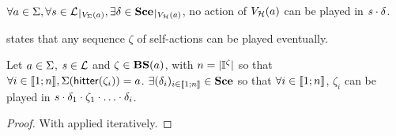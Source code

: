 \begin{corollary}
\label{co:totalss}
  $\forall a \in \PHs, \forall s \in \restriction{\PHl}{\Vs(a)}, \exists \delta \in \restriction{\Sce}{\Vh(a)}$, no action of $V_{\mathcal{H}}(a)$ can be played in $s \cdot \delta$.
\end{corollary}



 states that any sequence $\zeta$ of self-actions can be played eventually.
\begin{theorem}
\label{th:autohits}
  Let $a \in \Sigma$, $s \in \mathcal{L}$ and $\zeta \in \mathbf{BS}(a)$, with $n = |\mathbb{I}^{\zeta}|$ so that $\forall i \in \llbracket 1; n \rrbracket, \Sigma(\mathsf{hitter}(\zeta_i)) = a$.
  $\exists (\delta_i)_{i \in \llbracket 1; n \rrbracket} \in \mathbf{Sce}$ so that $\forall i \in \llbracket 1; n \rrbracket$, $\zeta_i$ can be played in $s \PHplay \delta_1 \PHplay \zeta_1 \PHplay \dots \PHplay \delta_i$. 
\end{theorem}

\begin{proof}
  With  applied iteratively.
\end{proof}

